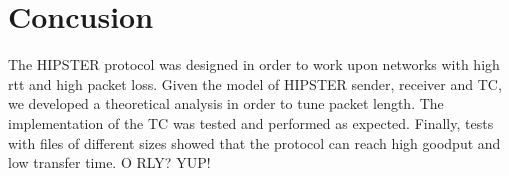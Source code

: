 \documentclass[10pt,twocolumn]{article}
\begin{document}
\section{Concusion}
The HIPSTER protocol was designed in order to work upon networks with high rtt and high packet loss. Given the model of HIPSTER sender, receiver and TC, we developed a theoretical analysis in order to tune packet length. The implementation of the TC was tested and performed as expected. Finally, tests with files of different sizes showed that the protocol can reach high goodput and low transfer time.
O RLY? YUP!
\end{document}
